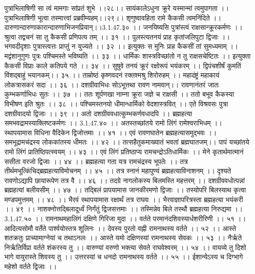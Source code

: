 पुत्राभिलाषिणी सा त्वं मामगाः सांप्रतं शुभे ।।२८।।
सायंकालेऽधुना क्रूरे यस्मान्मां त्वमुपागता ।।
पुत्राभिलाषिणी भूत्वा तस्मात्त्वां प्रब्रवीम्यहम्।।२९।।
शृणुष्वावहिता रामे कैकसी त्वमनिंदिते ।।
दारुणान्दारुणाकारान्दारुणाभिजनप्रियान्।।3.1.47.३० ।।
जनयिष्यसि पुत्रांस्त्वं राक्षसान्क्रूरकर्मणः ।।
श्रुत्वा तद्वचनं सा तु कैकसी प्रणिपत्य तम् ।। ३१ ।।
पुलस्त्यतनयं प्राह कृतांजलिपुटा द्विजाः ।।
भगवदीदृशाः पुत्रास्त्वत्तः प्राप्तुं न युज्यते ।। ३२ ।।
इत्युक्तः स मुनिः प्राह कैकसीं तां सुमध्यमाम् ।।
मद्वंशानुगुणः पुत्रः पश्चिमस्ते भविष्यति ।। ३३ ।।
धार्मिकः शास्त्रविच्छांतो न तु राक्षसचेष्टितः ।।
इत्युक्ता कैकसी विप्राः काले कतिपये गते ।। ३४ ।।
सुषुवे तनयं क्रूरं रक्षोरूपं भयंकरम् ।।
द्विपंचशीर्षं कुमतिं विंशद्बाहुं भयानकम्।। ३५ ।।
ताम्रोष्ठं कृष्णवदनं रक्तश्मश्रु शिरोरुहम् ।।
महादंष्ट्रं महाकायं लोकत्रासकरं सदा ।। ३६ ।।
दशग्रीवाभिधः सोऽभूत्तथा रावण नामवान्।।
रावणानंतरं जातः कुम्भकर्णाभिधः सुतः ।। ३७ ।।
ततः शूर्पणखा नाम्ना क्रूरा जज्ञे च राक्षसी ।।
ततो बभूव कैकस्या विभीषण इति श्रुतः ।। ३८ ।।
पश्चिमस्तनयो धीमान्धार्मिको वेदशास्त्रवित् ।।
एते विश्रवसः पुत्रा दशग्रीवादयो द्विजाः ।। ३९ ।।
अतो दशग्रीववधात्कुम्भकर्णवधादपि ।।
ब्रह्महत्या समभवद्रामस्याक्लिष्टकर्मणः ।। 3.1.47.४० ।।
अतस्तच्छांतये रामो लिंगं रामेश्वराभिधम् ।।
स्थापयामास विधिना वैदिकेन द्विजोत्तमाः ।। ४१ ।।
एवं रावणघातेन ब्रह्महत्यासमुद्भवः ।।
समभूद्रामचंद्रस्य लोककांतस्य धीमतः ।। ४२ ।।
तत्सहैतुकमाख्यातं भवतां ब्रह्मघातजम्।।
पापं यच्छांतये रामो लिंगं प्रातिष्ठिपत्स्वयम् ।। ४३ ।।
एवं लिंगं प्रतिष्ठाप्य रामचन्द्रोऽतिधार्मिकः ।।
मेने कृतार्थमात्मानं ससीता वरजो द्विजाः ।। ४४ ।।
ब्रह्महत्या गता यत्र रामचंद्रस्य भूपतेः ।।
तत्र तीर्थमभूत्किंचिद्ब्रह्महत्याविमोचनम् ।। ४५ ।।
तत्र स्नानं महापुण्यं ब्रह्महत्याविनाशनम् ।।
दृश्यते रावणोऽद्यापि छायारूपेण तत्र वै ।। ४६ ।।
तदग्रे नागलोकस्य बिलमस्ति महत्तरम् ।।
दशग्रीववधोत्पन्नां ब्रह्महत्यां बलीयसीम् ।। ४७ ।।
तद्बिलं प्रापयामास जानकीरमणो द्विजाः ।।
तस्योपरि बिलस्याथ कृत्वा मण्डपमुत्तमम् ।। ४८ ।।
भैरवं स्थापयामास रक्षार्थं तत्र राघवः ।।
भैरवाज्ञापरित्रस्ता ब्रह्महत्या भयंकरी ।। ४९ ।।
नाशक्नोत्तद्बिलादूर्ध्वं निर्गंतुं द्विजसत्तमाः ।।
तस्मिन्नेव बिले तस्थौ ब्रह्महत्या निरुद्यमा ।। 3.1.47.५० ।।
रामनाथमहालिंगं दक्षिणे गिरिजा मुदा ।।
वर्तते परमानंदशिवस्यार्धशरीरिणी ।। ५१ ।।
आदित्यसोमौ वर्तेते पार्श्वयोस्तत्र शूलिनः ।।
देवस्य पुरतो वह्नी रामनाथस्य वर्तते ।। ५२ ।।
आस्ते शतक्रतुः प्राच्यामाग्नेयां च तथाऽनलः ।।
आस्ते यमो दक्षिणस्यां रामनाथस्य सेवकः ।। ५३ ।।
नैर्ऋते निर्ऋतिर्विप्रा वर्तते शंकरस्य तु ।।
वारुण्यां वरुणो भक्त्या सेवते राघवेश्वरम् ।। ५४ ।।
वायव्ये तु दिशो भागे वायुरास्ते शिवस्य तु ।।
उत्तरस्यां च धनदो रामनाथस्य वर्तते ।। ५५ ।।
ईशान्येऽस्य च दिग्भागे महेशो वर्तते द्विजाः ।।
